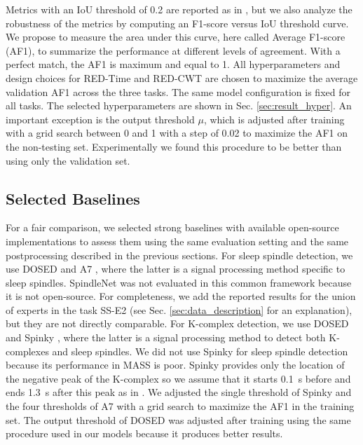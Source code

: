 \documentclass[conference]{IEEEtran}
\begin{document}
Metrics with an IoU threshold of 0.2 are reported as in \cite{warby2014sleep}, but we also analyze the robustness of the metrics by computing an F1-score versus IoU threshold curve. We propose to measure the area under this curve, here called Average F1-score (AF1), to summarize the performance at different levels of agreement. With a perfect match, the AF1 is maximum and equal to 1.
All hyperparameters and design choices for RED-Time and RED-CWT are chosen to maximize the average validation AF1 across the three tasks. The same model configuration is fixed for all tasks. The selected hyperparameters are shown in Sec. \ref{sec:result_hyper}. An important exception is the output threshold $\mu$, which is adjusted after training with a grid search between 0 and 1 with a step of 0.02 to maximize the AF1 on the non-testing set. Experimentally we found this procedure to be better than using only the validation set.

\subsection{Selected Baselines}
\label{sec:baselines}

For a fair comparison, we selected strong baselines with available open-source implementations to assess them using the same evaluation setting and the same postprocessing described in the previous sections. For sleep spindle detection, we use DOSED \cite{chambon2019dosed} and A7 \cite{lacourse2019sleep}, where the latter is a signal processing method specific to sleep spindles. SpindleNet \cite{kulkarni2019deep} was not evaluated in this common framework because it is not open-source. For completeness, we add the reported results for the union of experts in the task SS-E2 (see Sec. \ref{sec:data_description} for an explanation), but they are not directly comparable. For K-complex detection, we use DOSED and Spinky \cite{lajnef2017meet}, where the latter is a signal processing method to detect both K-complexes and sleep spindles. We did not use Spinky for sleep spindle detection because its performance in MASS is poor. Spinky provides only the location of the negative peak of the K-complex so we assume that it starts 0.1~s before and ends 1.3~s after this peak as in \cite{lajnef2017meet}. We adjusted the single threshold of Spinky and the four thresholds of A7 with a grid search to maximize the AF1 in the training set. The output threshold of DOSED was adjusted after training using the same procedure used in our models because it produces better results.
\end{document}
